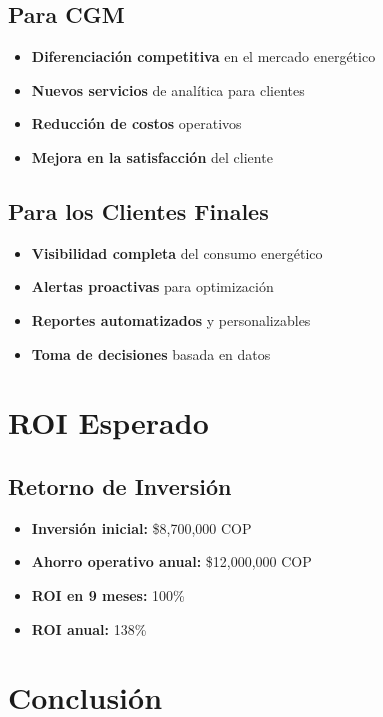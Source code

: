 \documentclass[12pt,a4paper]{article}
\begin{document}
\subsection{Para CGM}

\begin{itemize}
    \item \textbf{Diferenciación competitiva} en el mercado energético
    \item \textbf{Nuevos servicios} de analítica para clientes
    \item \textbf{Reducción de costos} operativos
    \item \textbf{Mejora en la satisfacción} del cliente
\end{itemize}

\subsection{Para los Clientes Finales}

\begin{itemize}
    \item \textbf{Visibilidad completa} del consumo energético
    \item \textbf{Alertas proactivas} para optimización
    \item \textbf{Reportes automatizados} y personalizables
    \item \textbf{Toma de decisiones} basada en datos
\end{itemize}

\section{ROI Esperado}

\subsection{Retorno de Inversión}

\begin{itemize}
    \item \textbf{Inversión inicial:} \$8,700,000 COP
    \item \textbf{Ahorro operativo anual:} \$12,000,000 COP
    \item \textbf{ROI en 9 meses:} 100\%
    \item \textbf{ROI anual:} 138\%
\end{itemize}

\section{Conclusión}
\end{document}
